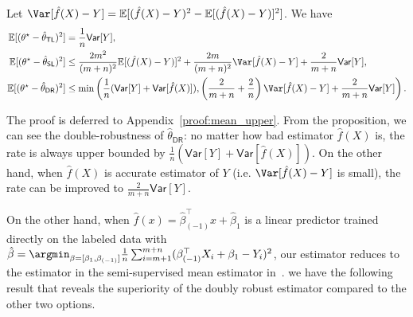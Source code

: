 \begin{proposition}\label{prop:mean_upper}
Let $\Var[{\hat f(X)-Y}] = \mathbb{E}[(\hat f(X)-Y)^2 - \mathbb{E}[(\hat f(X)-Y)]^2]$. We have
   \begin{align*}
    \mathbb{E}[(\theta^\star -  \hat \theta_{\mathsf{TL}})^2] & =  \frac{1}{n} \mathsf{Var}[Y], \\
      \mathbb{E}[(\theta^\star -  \hat \theta_{\mathsf{SL}})^2] &  \leq \frac{2m^2}{(m+n)^2} \mathbb{E}[(\hat f(X)-Y)]^2 + \frac{2m}{(m+n)^2}\Var[{\hat f(X)-Y}]  + \frac{2}{m+n} \mathsf{Var}[Y], \\ 
   \mathbb{E}[(\theta^\star -  \hat \theta_{\mathsf{DR}})^2]  & \leq  \min\left(\frac{1}{n} (\mathsf{Var}[Y]+\mathsf{Var}[\hat f(X)]), \left(\frac{2}{m+n}+ \frac{2}{n}\right)\Var[{\hat f(X)-Y}]  + \frac{2}{m+n} \mathsf{Var}[Y]\right).
\end{align*} 
 \end{proposition}
The proof is deferred to Appendix~\ref{proof:mean_upper}. From the proposition, we can see the double-robustness of $\hat \theta_{\mathsf{DR}}$: no matter how bad estimator $\hat f(X)$ is, the rate is always upper bounded by $\frac{1}{n} (\mathsf{Var}[Y]+\mathsf{Var}[\hat f(X)])$. On the other hand, when $\hat f(X)$ is accurate estimator of $Y$ (i.e. $\Var[{\hat f(X)-Y}]$ is small), the rate can be improved to $ \frac{2}{m+n} \mathsf{Var}[Y]$. 

On the other hand, when $\hat f(x) = \hat \beta_{(-1)}^\top x + \hat\beta_{1}$ is a linear predictor trained directly on the labeled data with $\hat \beta = \argmin_{\beta=[\beta_1, \beta_{(-1)}]} \frac{1}{n}    \sum_{i=m+1}^{m+n} (\beta_{(-1)}^\top X_i +  \beta_{1}- Y_i)^2$, our estimator reduces to the estimator in the semi-supervised mean estimator in~\citet{zhang2019semi}. we have the following result  that reveals the superiority of the doubly robust estimator compared to the other two options. 

